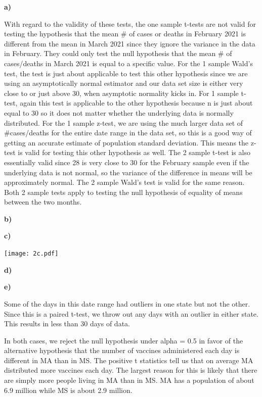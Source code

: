 \documentclass[12pt]{article}
\def\pp{\par\noindent}
\renewcommand{\part}[1]{\smallskip\pp\textbf{#1)}\indent}
\begin{document}
\part{a}

\par With regard to the validity of these tests, the one sample
t-tests are not valid for testing the hypothesis that the mean \# of
cases or deaths in February 2021 is different from the mean in March
2021 since they ignore the variance in the data in February. They
could only test the null hypothesis that the mean \# of cases/deaths in
March 2021 is equal to a specific value. For the 1
sample Wald's test, the test is just about applicable to test this
other hypothesis since we are using an asymptotically normal estimator
and our data set size is either very close to or just above 30, when
asymptotic normality kicks in. For 1 sample t-test, again this test is
applicable to the other hypothesis because n is just about equal to 30
so it does not matter whether the underlying data is normally
distributed. For the 1 sample z-test, we are using the much larger
data set of \#cases/deaths for the entire date range in the data set,
so this is a good way of getting an accurate estimate of population
standard deviation. This means the z-test is valid for testing this
other hypothesis as well. The 2 sample t-test is also essentially
valid since 28 is very close to 30 for the February sample even if the
underlying data is not normal, so the variance of the difference in
means will be approximately normal. The 2 sample Wald's test is valid
for the same reason. Both 2 sample tests apply to testing the null
hypothesis of equality of means between the two months.
\part{b}

\part{c}

\pp\texttt{[image: 2c.pdf]}
\part{d}

\part{e}
\par Some of the days in this date range had outliers in one state but
not the other. Since this is a paired t-test, we throw out any days
with an outlier in either state. This results in less than 30 days of
data.

\par In both cases, we reject the null hypothesis under alpha = 0.5 in
favor of the alternative hypothesis that the number of vaccines
administered each day is different in MA than in MS. The positive t
statistics tell us that on average MA distributed more vaccines each
day. The largest reason for this is likely that there are simply more
people living in MA than in MS. MA has a population of about 6.9
million while MS is about 2.9 million.
\end{document}
